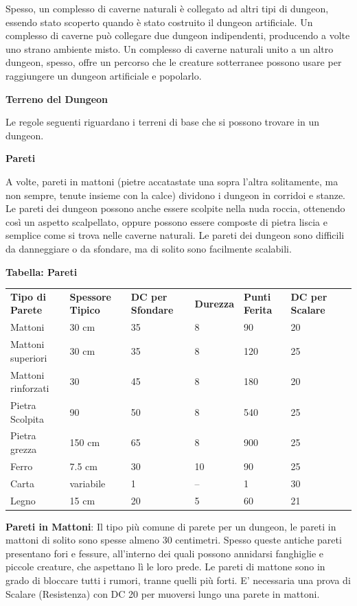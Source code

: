 \documentclass[a4paper,11pt,twoside,openany]{book}
\begin{document}
Spesso, un complesso di caverne naturali è collegato ad altri tipi di dungeon, essendo stato scoperto quando è stato costruito il dungeon artificiale. Un complesso di caverne può collegare due dungeon indipendenti, producendo a volte uno strano ambiente misto. Un complesso di caverne naturali unito a un altro dungeon, spesso, offre un percorso che le creature sotterranee possono usare per raggiungere un dungeon artificiale e popolarlo.

\textbf{Terreno del Dungeon}

Le regole seguenti riguardano i terreni di base che si possono trovare in un dungeon.

\textbf{Pareti}

A volte, pareti in mattoni (pietre accatastate una sopra l'altra solitamente, ma non sempre, tenute insieme con la calce) dividono i dungeon in corridoi e stanze. Le pareti dei dungeon possono anche essere scolpite nella nuda roccia, ottenendo così un aspetto scalpellato, oppure possono essere composte di pietra liscia e semplice come si trova nelle caverne naturali. Le pareti dei dungeon sono difficili da danneggiare o da sfondare, ma di solito sono facilmente scalabili.

\bigskip

\textbf{Tabella: Pareti}
\medskip

\begin{tabular}{L{3cm}L{2.5cm}L{2cm}L{2cm}L{2cm}L{2.5cm}L{2cm}}
	\toprule
	\textbf{Tipo di Parete} & \textbf{Spessore Tipico} & \textbf{DC per Sfondare} & \textbf{Durezza} & \textbf{Punti Ferita} & \textbf{DC per Scalare}\\
	Mattoni  & 30 cm& 35   & 8 & 90& 20\\
	Mattoni superiori  & 30 cm& 35   & 8 & 120    & 25\\
	Mattoni rinforzati & 30   & 45   & 8 & 180    & 20\\
	Pietra Scolpita    & 90   & 50   & 8 & 540    & 25\\
	Pietra grezza & 150 cm    & 65   & 8 & 900    & 25\\
	Ferro    & 7.5 cm    & 30   & 10& 90& 25\\
	Carta    & variabile & 1    & --& 1 & 30\\
	Legno    & 15 cm& 20   & 5 & 60& 21\\
\end{tabular}

\bigskip

\textbf{Pareti in Mattoni}: Il tipo più comune di parete per un dungeon, le pareti in mattoni di solito sono spesse almeno 30 centimetri. Spesso queste antiche pareti presentano fori e fessure, all'interno dei quali possono annidarsi fanghiglie e piccole creature, che aspettano lì le loro prede. Le pareti di mattone sono in grado di bloccare tutti i rumori, tranne quelli più forti. E' necessaria una prova di Scalare (Resistenza) con DC 20 per muoversi lungo una parete in mattoni.
\end{document}

